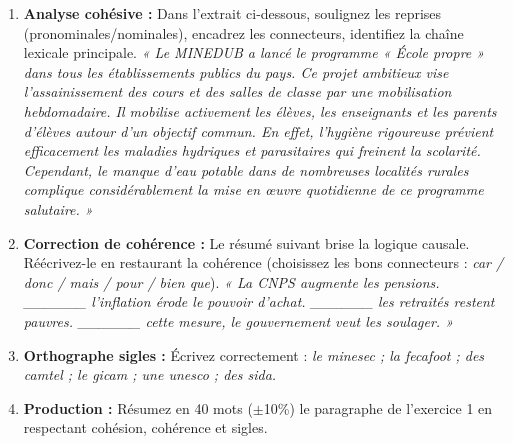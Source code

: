 \documentclass[11pt]{article}
\begin{document}
\begin{exercice}
\begin{enumerate}
    \item \textbf{Analyse cohésive :} Dans l'extrait ci-dessous, soulignez les reprises (pronominales/nominales), encadrez les connecteurs, identifiez la chaîne lexicale principale.
    \emph{« Le MINEDUB a lancé le programme « École propre » dans tous les établissements publics du pays. Ce projet ambitieux vise l'assainissement des cours et des salles de classe par une mobilisation hebdomadaire. Il mobilise activement les élèves, les enseignants et les parents d'élèves autour d'un objectif commun. En effet, l'hygiène rigoureuse prévient efficacement les maladies hydriques et parasitaires qui freinent la scolarité. Cependant, le manque d'eau potable dans de nombreuses localités rurales complique considérablement la mise en œuvre quotidienne de ce programme salutaire. »}
    \item \textbf{Correction de cohérence :} Le résumé suivant brise la logique causale. Réécrivez-le en restaurant la cohérence (choisissez les bons connecteurs : \emph{car / donc / mais / pour / bien que}).
    \emph{« La CNPS augmente les pensions. \_\_\_\_\_\_ l'inflation érode le pouvoir d'achat. \_\_\_\_\_\_ les retraités restent pauvres. \_\_\_\_\_\_ cette mesure, le gouvernement veut les soulager. »}
    \item \textbf{Orthographe sigles :} Écrivez correctement : \emph{le minesec ; la fecafoot ; des camtel ; le gicam ; une unesco ; des sida.}
    \item \textbf{Production :} Résumez en 40 mots ($\pm$10\%) le paragraphe de l'exercice 1 en respectant cohésion, cohérence et sigles.
\end{enumerate}
\end{exercice}
\end{document}
